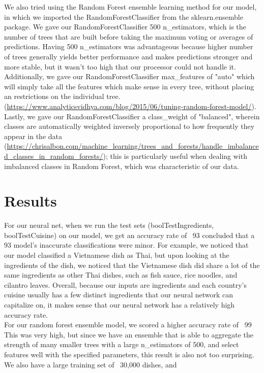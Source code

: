 \documentclass[11pt]{article}
\begin{document}

We also tried using the Random Forest ensemble learning method for our model,
in which we imported the RandomForestClassifier from the sklearn.ensemble package.
We gave our RandomForestClassifier 500 n\_estimators, which is the number of trees
that are built before taking the maximum voting or averages of predictions. Having
500 n\_estimators was advantageous because higher number of trees generally yields
better performance and makes predictions stronger and more stable, but it wasn't
too high that our processor could not handle it. Additionally, we gave our
RandomForestClassifier max\_features of "auto" which will simply take all the
features which make sense in every tree, without placing an restrictions on
the individual tree. (\url{https://www.analyticsvidhya.com/blog/2015/06/tuning-random-forest-model/}).
Lastly, we gave our RandomForestClassifier a class\_weight of "balanced", wherein
classes are automatically weighted inversely proportional to how frequently they
appear in the data (\url{https://chrisalbon.com/machine_learning/trees_and_forests/handle_imbalanced_classes_in_random_forests/});
this is particularly useful when dealing with imbalanced classes in Random Forest,
which was characteristic of our data.

\section{Results}

For our neural net, when we run the test sets (boolTestIngredients, boolTestCuisine)
on our model, we get an accuracy rate of ~93%
concluded that a 93%
model's inaccurate classifications were minor. For example, we noticed that
our model classified a Vietnamese dish as Thai, but upon looking at the ingredients
of the dish, we noticed that the Vietnamese dish did share a lot of the same
ingredients as other Thai dishes, such as fish sauce, rice noodles, and cilantro
leaves. Overall, because our inputs are ingredients and each country's cuisine usually
has a few distinct ingredients that our neural network can capitalize on,
it makes sense that our neural network has a relatively high accuracy rate. \\

For our random forest ensemble model, we scored a higher accuracy rate of ~99%
This was very high, but since we have an ensemble that is able to aggregate
the strength of many smaller trees with a large n\_estimators of 500, and select
features well with the specified parameters, this result is also not too surprising.
We also have a large training set of ~30,000 dishes, and 
\end{document}
